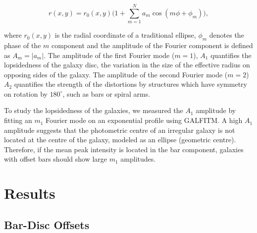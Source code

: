 \documentclass[a4paper,fleqn,usenatbib,useAMS]{mnras}
\begin{document}
\begin{equation}
r(x,y) = r_{0}(x,y) \Big (1+ \sum_{m=1} ^{N}a_{m} \cos(m\phi+\phi_{m}) \Big ),
\end{equation}


\noindent  where $r_{0}(x,y)$ is the radial coordinate of a traditional ellipse,  $\phi_{m}$ denotes the phase of the $\textit{m}$ component and the amplitude of the Fourier component is defined as $A_{m}=|a_{m}|$. The amplitude of the first Fourier mode ($\textit{m}=1$), $A_{1}$ quantifies the lopsidedness of the galaxy disc, the variation in the size of the effective radius on opposing sides of the galaxy. The amplitude of the second Fourier mode ($\textit{m}=2$) $A_{2}$ quantifies the strength of the distortions by structures which have symmetry on rotation by $180^{\circ}$, such as bars or spiral arms. 

To study the lopsidedness of the galaxies, we measured the $A_{1}$ amplitude by fitting an $m_{1}$ Fourier mode on an exponential profile using GALFITM. A high $A_{1}$ amplitude suggests that the photometric centre of an irregular galaxy is not located at the centre of the galaxy, modeled as an ellipse (geometric centre). Therefore, if the mean peak intensity is located in the bar component, galaxies with offset bars should show large $m_{1}$ amplitudes. 


\section{Results}

\subsection{Bar-Disc Offsets}
\end{document}

